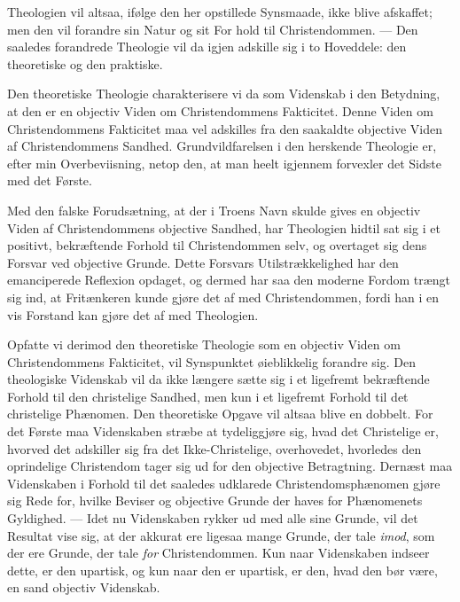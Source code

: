 \documentclass[12pt,a4paper]{book}
\newcommand{\opage}[1]{\marginnote{\footnotesize\textit{[#1]}}}
\begin{document}
Theologien vil altsaa, ifølge den her opstillede Synsmaade, ikke blive
afskaffet; men den vil forandre sin Natur og sit For\-%
\opage{145}hold til Christendommen. --- Den saaledes forandrede Theologie vil da igjen
adskille sig i to Hoveddele: den theoretiske og den praktiske.

Den theoretiske Theologie charakterisere vi da som Videnskab i den Betydning,
at den er en objectiv Viden om Christendommens Fakticitet. Denne Viden om
Christendommens Fakticitet maa vel adskilles fra den saakaldte objective Viden
af Christendommens Sandhed. Grundvildfarelsen i den herskende Theologie er,
efter min Overbeviisning, netop den, at man heelt igjennem forvexler det Sidste
med det Første.

Med den falske Forudsætning, at der i Troens Navn skulde gives en objectiv
Viden af Christendommens objective Sandhed, har Theologien hidtil sat sig i et
positivt, bekræftende Forhold til Christendommen selv, og overtaget sig dens
Forsvar ved objective Grunde. Dette Forsvars Utilstrækkelighed har den
emanciperede Reflexion opdaget, og dermed har saa den moderne Fordom trængt sig
ind, at Fritænkeren kunde gjøre det af med Christendommen, fordi han i en vis
Forstand kan gjøre det af med Theologien.

Opfatte vi derimod den theoretiske Theologie som en objectiv Viden om
Christendommens Fakticitet, vil Synspunktet øieblikkelig forandre sig. Den
theologiske Videnskab vil da ikke længere sætte sig i et ligefremt bekræftende
Forhold til den christelige Sandhed, men kun i et ligefremt Forhold til det
christelige Phænomen. Den theoretiske Opgave vil altsaa blive en dobbelt. For
det Første maa Videnskaben stræbe at tydeliggjøre sig, hvad det Christelige er,
hvorved det adskiller sig fra det Ikke-Christelige, overhovedet, hvorledes den
oprindelige Christendom tager sig ud for den objective Betragtning. Dernæst maa
Videnskaben i Forhold til det saaledes udklarede Christendomsphænomen gjøre sig
Rede for, hvilke Beviser og objective Grunde der haves for Phænomenets
Gyldighed. --- Idet nu Videnskaben rykker ud med
\opage{146} %
alle sine Grunde, vil det Resultat vise sig, at der akkurat ere ligesaa mange
Grunde, der tale \emph{imod}, som der ere Grunde, der tale \emph{for}
Christendommen. Kun naar Videnskaben indseer dette, er den upartisk, og kun naar
den er upartisk, er den, hvad den bør være, en sand objectiv Videnskab.
\end{document}
